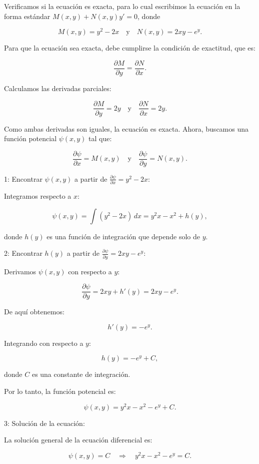 \documentclass[answers]{exam}
\begin{document}
\begin{questions}
\begin{parts}
		Verificamos si la ecuación es exacta, para lo cual escribimos la ecuación en la forma estándar \( M(x, y) + N(x, y) y' = 0 \), donde

		\[
			M(x, y) = y^2 - 2x \quad \text{y} \quad N(x, y) = 2xy - e^y.
		\]

		Para que la ecuación sea exacta, debe cumplirse la condición de exactitud, que es:

		\[
			\frac{\partial M}{\partial y} = \frac{\partial N}{\partial x}.
		\]

		Calculamos las derivadas parciales:

		\[
			\frac{\partial M}{\partial y} = 2y \quad \text{y} \quad \frac{\partial N}{\partial x} = 2y.
		\]

		Como ambas derivadas son iguales, la ecuación es exacta. Ahora, buscamos una función potencial \( \psi(x, y) \) tal que:

		\[
			\frac{\partial \psi}{\partial x} = M(x, y) \quad \text{y} \quad \frac{\partial \psi}{\partial y} = N(x, y).
		\]

		1: Encontrar \( \psi(x, y) \) a partir de \( \frac{\partial \psi}{\partial x} = y^2 - 2x \):

		Integramos respecto a \( x \):

		\[
			\psi(x, y) = \int (y^2 - 2x) \, dx = y^2 x - x^2 + h(y),
		\]

		donde \( h(y) \) es una función de integración que depende solo de \( y \).

		2: Encontrar \( h(y) \) a partir de \( \frac{\partial \psi}{\partial y} = 2xy - e^y \):

		Derivamos \( \psi(x, y) \) con respecto a \( y \):

		\[
			\frac{\partial \psi}{\partial y} = 2xy + h'(y) = 2xy - e^y.
		\]

		De aquí obtenemos:

		\[
			h'(y) = -e^y.
		\]

		Integrando con respecto a \( y \):

		\[
			h(y) = -e^y + C,
		\]

		donde \( C \) es una constante de integración.

		Por lo tanto, la función potencial es:

		\[
			\psi(x, y) = y^2 x - x^2 - e^y + C.
		\]

		3: Solución de la ecuación:

		La solución general de la ecuación diferencial es:

		\[
			\psi(x, y) = C \quad \Rightarrow \quad y^2 x - x^2 - e^y = C.
		\]


\end{parts}
\end{questions}
\end{document}
